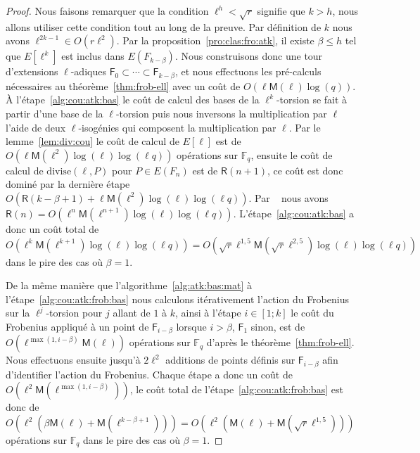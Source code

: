 \documentclass[10pt,a4paper]{book}
\theoremstyle{plain}
\theoremstyle{definition}
\theoremstyle{definition}
\theoremstyle{definition}
\theoremstyle{definition}
\theoremstyle{definition}
\theoremstyle{remark}
\theoremstyle{remark}
\theoremstyle{definition}
\begin{document}
\begin{proof}
\sloppy
Nous faisons remarquer que la condition $\ell^h < \sqrt{r}$ signifie que $k>h$, 
nous allons utiliser cette condition tout au long de la preuve.
Par définition de $k$ nous avons $\ell^{2k-1} \in O(r\ell^2)$.
Par la proposition~\ref{pro:clas:fro:atk}, il existe $\beta \leqslant h$ tel que
$E[\ell^k]$ est inclus dans $E(F_{k-\beta})$. Nous construisons donc une
tour d'extensions $\ell$-adiques $\mathsf{F}_0\subset\cdots\subset 
\mathsf{F}_{k-\beta}$, et nous effectuons les pré-calculs nécessaires au 
théorème~\ref{thm:frob-ell} avec un coût de $O(\ell\mathsf{M}(\ell)\log(q))$.
\`A l'étape~\ref{alg:cou:atk:bas} le coût de calcul des bases de la 
$\ell^k$-torsion se fait à partir d'une base de la $\ell$-torsion puis nous 
inversons la multiplication par $\ell$ l'aide de deux $\ell$-isogénies qui 
composent la multiplication par $\ell$. Par le lemme~\ref{lem:div:cou} le coût 
de calcul de $E[\ell]$ est de 
$O(\ell \mathsf{M}(\ell^2)\log(\ell)\log(\ell q))$ opérations sur 
$\mathbb{F}_q$, ensuite le coût de calcul de $\mathrm{divise}(\ell,P)$ pour 
$P \in E(F_n)$ est de $\mathsf{R}(n+1)$, ce coût est donc dominé par la 
dernière étape
$O(\mathsf{R}(k-\beta+1)+\ell \mathsf{M}(\ell^2)\log(\ell)\log(\ell q))$.
Par ~\cite[Chapter~14.5]{vzGJG03} nous avons $\mathsf{R}(n)=
O(\ell^n\mathsf{M}(\ell^{n+1})\log(\ell)\log(\ell q))$. 
L'étape~\ref{alg:cou:atk:bas} a donc un coût total de 
\[
O(\ell^k \mathsf{M}
(\ell^{k+1})\log(\ell)\log(\ell q))=O(\sqrt{r}\ell^{1,5}\mathsf{M}(\sqrt{r}\ell^{2,5})\log(\ell)\log(\ell q))
\] 
dans le pire des cas où $\beta=1$.
\fussy

De la même manière que l'algorithme~\ref{alg:atk:bas:mat} à 
l'étape~\ref{alg:cou:atk:frob:bas} nous calculons itérativement l'action du 
Frobenius sur la $\ell^j$-torsion pour $j$ allant de $1$ à $k$, ainsi à l'étape
$i \in [1;k]$ le coût du Frobenius
appliqué à un point de $\mathsf{F}_{i-\beta}$ lorsque $i>\beta$, $\mathsf{F}_1$
sinon, est de $O(\ell^{\max(1,i-\beta)}\mathsf{M}(\ell))$ opérations sur 
$\mathbb{F}_q$ d'après le théorème~\ref{thm:frob-ell}. Nous effectuons ensuite 
jusqu'à $2\ell^2$ additions de points définis sur $\mathsf{F}_{i-\beta}$ afin 
d'identifier l'action du Frobenius. Chaque étape a donc un coût de 
$O(\ell^2 \mathsf{M}(\ell^{\max(1,i-\beta)}))$,
le coût total de l'étape~\ref{alg:cou:atk:frob:bas} est donc de 
$O(\ell^2(\beta \mathsf{M}(\ell)+\mathsf{M}(\ell^{k-\beta+1})))=
O(\ell^2( \mathsf{M}(\ell)+\mathsf{M}(\sqrt{r}\ell^{1,5})))$ 
opérations sur $\mathbb{F}_q$ dans le pire des cas où $\beta=1$.


\end{proof}
\end{document}
